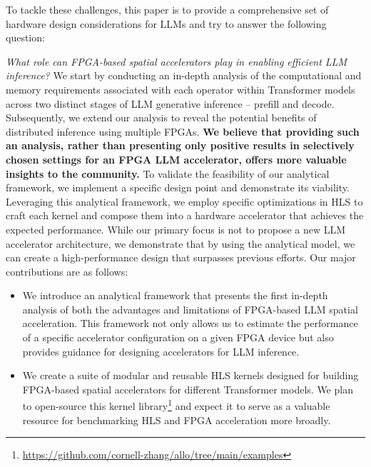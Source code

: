 To tackle these challenges,
this paper is to provide a comprehensive set of hardware design considerations for LLMs and try to answer the following question: {\emph{What role can FPGA-based spatial accelerators play in enabling efficient LLM inference?}
We start by conducting an in-depth analysis of the computational and memory requirements associated with each operator within Transformer models across two distinct stages of LLM generative inference -- prefill and decode.
Subsequently, we extend our analysis to reveal the potential benefits of distributed inference using multiple FPGAs.
\textbf{We believe that providing such an analysis, rather than presenting only positive results in selectively chosen settings for an FPGA LLM accelerator, offers more valuable insights to the community.}
To validate the feasibility of our analytical framework, we implement a specific design point and demonstrate its viability.
Leveraging this analytical framework, we employ specific optimizations in HLS to craft each kernel and compose them into a hardware accelerator that achieves the expected performance.
While our primary focus is not to propose a new LLM accelerator architecture, we demonstrate that by using the analytical model, we can create a high-performance design that surpasses previous efforts.
Our major contributions are as follows: 

\begin{itemize}
    \item %
    We introduce an analytical framework that presents the first in-depth analysis of both the advantages and limitations of FPGA-based LLM spatial acceleration.
    This framework not only allows us to estimate the performance of a specific accelerator configuration on a given FPGA device but also provides guidance for designing accelerators for LLM inference.
    
    \item %
    We create a suite of modular and reusable HLS kernels designed for building FPGA-based spatial accelerators for different Transformer models. We plan to open-source this kernel library\footnote{\url{https://github.com/cornell-zhang/allo/tree/main/examples}} and expect it to serve as a valuable resource for benchmarking HLS and FPGA acceleration more broadly.
    

\end{itemize}}
